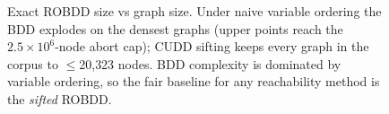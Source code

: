 
\begin{figure}[t]\centering
{}
\caption{Exact ROBDD size vs graph size. Under naive variable ordering the BDD explodes on the densest
graphs (upper points reach the $2.5\times10^{6}$-node abort cap); CUDD sifting keeps every graph in the
corpus to $\le$20{,}323 nodes. BDD complexity is dominated by variable ordering, so the fair baseline for
any reachability method is the \emph{sifted} ROBDD.}
\label{fig:ordering}
\end{figure}

